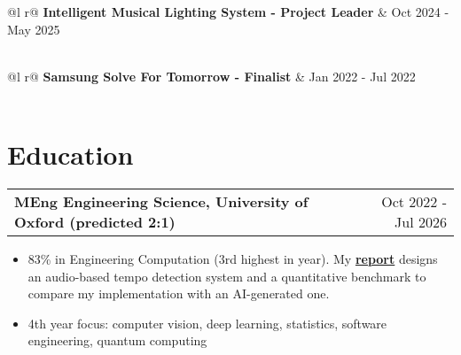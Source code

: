 \documentclass[a4paper,10pt]{article}
\makeatletter
\newenvironment{joblong}[2]
    {
    \begin{tabularx}{\linewidth}{@{}l X r@{}}
    \textbf{#1} & \hfill &  #2 \\[2pt]
    \end{tabularx}
    \begin{minipage}[t]{\linewidth}
    \begin{itemize}[nosep,after=\strut, leftmargin=1em, itemsep=1pt,label=--]
    }
    {
    \end{itemize}
    \end{minipage}    
    }
\makeatother
\begin{document}
\vspace{1pt}

\begin{tabularx}{\linewidth}{ @{}l r@{} }
\textbf{Intelligent Musical Lighting System - Project Leader} & \hfill Oct 2024 - May 2025 \\[2pt]
  \\
\end{tabularx}

\vspace{1pt}

\begin{tabularx}{\linewidth}{ @{}l r@{} }
\textbf{Samsung Solve For Tomorrow - Finalist} & \hfill Jan 2022 - Jul 2022 \\[2pt]
  \\
\end{tabularx}

\vspace{12pt}

\section{Education}

\begin{joblong}{MEng Engineering Science, University of Oxford (predicted 2:1)}{Oct 2022 - Jul 2026}
\item 83\% in Engineering Computation (3rd highest in year). My \href{https://1drv.ms/w/c/2231ec07d9c13e7f/EbBw1_GjsddKisXCrGTLfm8BNU2B3_Np0jlqxh2wpgtM_w}{\textbf{report}} designs an audio-based tempo detection system and a quantitative benchmark to compare my implementation with an AI-generated one.
\item 4th year focus: computer vision, deep learning, statistics, software engineering, quantum computing
\end{joblong}
\end{document}
